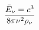 \documentclass[preview]{standalone}
\begin{document}
\begin{align*}
\bar{E}_{\nu}=  c ^{3}  \over 8\pi\nu^{2}  \rho_{\nu}
\end{align*}
\end{document}

